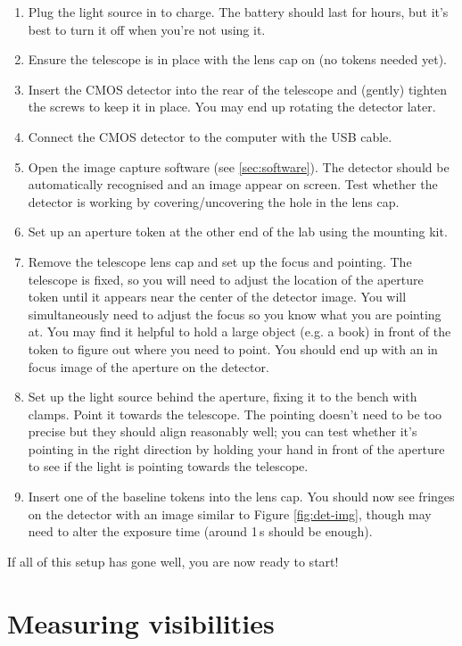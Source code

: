 \documentclass[11pt]{article}
\begin{document}
\begin{enumerate}
    \item Plug the light source in to charge. The battery should last for hours, but it's best to turn it off when you're not using it.
    \item Ensure the telescope is in place with the lens cap on (no tokens needed yet).
    \item Insert the CMOS detector into the rear of the telescope and (gently) tighten the screws to keep it in place. You may end up rotating the detector later.
    \item Connect the CMOS detector to the computer with the USB cable.
    \item Open the image capture software (see \ref{sec:software}). The detector should be automatically recognised and an image appear on screen. Test whether the detector is working by covering/uncovering the hole in the lens cap.
    \item Set up an aperture token at the other end of the lab using the mounting kit.
    \item Remove the telescope lens cap and set up the focus and pointing. The telescope is fixed, so you will need to adjust the location of the aperture token until it appears near the center of the detector image. You will simultaneously need to adjust the focus so you know what you are pointing at. You may find it helpful to hold a large object (e.g. a book) in front of the token to figure out where you need to point. You should end up with an in focus image of the aperture on the detector.
    \item Set up the light source behind the aperture, fixing it to the bench with clamps. Point it towards the telescope. The pointing doesn't need to be too precise but they should align reasonably well; you can test whether it's pointing in the right direction by holding your hand in front of the aperture to see if the light is pointing towards the telescope.
    \item Insert one of the baseline tokens into the lens cap. You should now see fringes on the detector with an image similar to Figure \ref{fig:det-img}, though may need to alter the exposure time (around 1\,s should be enough).
\end{enumerate}

If all of this setup has gone well, you are now ready to start!

\clearpage
\section{Measuring visibilities}\label{sec:meas}
\end{document}
